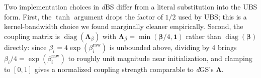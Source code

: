 \documentclass{article}
\newcommand{\dgs}{\textit{d}GS\xspace}
\newcommand{\dbs}{\textit{d}BS\xspace}
\theoremstyle{plain}
\theoremstyle{definition}
\theoremstyle{remark}
\begin{document}
Two implementation choices in \dbs{} differ from a literal substitution into the UBS form. First, the $\tanh$ argument drops the factor of $1/2$ used by UBS; this is a kernel-bandwidth choice we found marginally cleaner empirically. Second, the coupling matrix is $\operatorname{diag}(\boldsymbol{\Lambda}_\beta)$ with $\boldsymbol{\Lambda}_\beta = \min(\boldsymbol{\beta}/4,\mathbf{1})$ rather than $\operatorname{diag}(\boldsymbol{\beta})$ directly: since $\beta_i = 4\exp(\beta_i^{\text{raw}})$ is unbounded above, dividing by 4 brings $\beta_i/4 = \exp(\beta_i^{\text{raw}})$ to roughly unit magnitude near initialization, and clamping to $[0,1]$ gives a normalized coupling strength comparable to \dgs{}'s $\boldsymbol{\Lambda}$.
\end{document}
